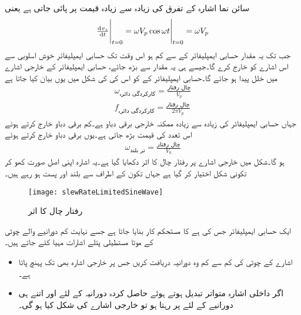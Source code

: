 سائن نما  اشارہ  کے تفرق کی زیادہ سے زیادہ قیمت  پر پائی جاتی ہے یعنی
\begin{align*}
\eval{\od{v_s}{t}}_{t=0}=\eval{\omega V_p \cos \omega t}_{t=0}=\omega V_p
\end{align*}
جب تک یہ مقدار حسابی ایمپلیفائر کے  سے کم ہو اس وقت تک حسابی ایمپلیفائر خوش اسلوبی سے اس اشارے کو خارج کرے گا۔جیسے ہی یہ مقدار  سے بڑھ جائے، حسابی ایمپلیفائر کے خارجی اشارے میں خلل پیدا ہو جائے گا۔حسابی ایمپلیفائر کے  کو اس کی  کی شکل میں یوں بیان کیا جاتا ہے
\begin{align}
\omega_{\textrm{کارکردگی دائرہ}}=\frac{\textrm{چال رفتار}}{V_p}\\
f_{\textrm{کارکردگی دائرہ}}=\frac{\textrm{چال رفتار}}{2 \pi V_p}
\end{align}   
جہاں  حسابی ایمپلیفائر کی زیادہ سے زیادہ ممکنہ  خارجی برقی دباو ہے۔کم برقی دباو خارج کرتے ہوئے اس تعدد کی قیمت بڑھ جاتی ہے۔یوں  برقی دباو خارج کرتے ہوئے
 \begin{align}
\omega_{\textrm{تر بلند}}=\frac{\textrm{چال رفتار}}{V_0}
\end{align}   
ہو گا۔شکل  میں خارجی اشارے پر رفتار چال کا اثر دکھایا گیا ہے۔یہ اشارہ  اپنی اصل صورت کھو کر تکونی شکل اختیار کر گیا ہے جہاں تکون کے اطراف  سے بلند اور پست ہو رہے ہیں۔
\begin{figure}
\centering
\texttt{[image: slewRateLimitedSineWave]}
\caption{رفتار چال کا اثر}
\label{شکل_حسابی_رفتار_چال_محدود_اشارہ}
\end{figure}
ایک حسابی ایمپلیفائر جس کی    ہے  کا مستحکم کار بنایا جاتا ہے جسے نہایت کم دورانیے والے  چوٹی کے موٹا {مستطیلی پتلے اشارات}  مہیا کئے جاتے ہیں۔
\begin{itemize}
\item
اشارے کے چوٹی کی کم سے کم وہ دورانیہ  دریافت کریں جس پر خارجی اشارہ بھی  تک پہنچ پاتا ہے۔
\item
اگر داخلی اشارہ متواتر تبدیل ہوتے ہوئے حاصل کردہ دورانیہ  کے لئے  اور اتنے ہی  دورانیے کے لئے  پر رہتا ہو تو خارجی اشارے کی شکل کیا ہو گی۔
\end{itemize}

